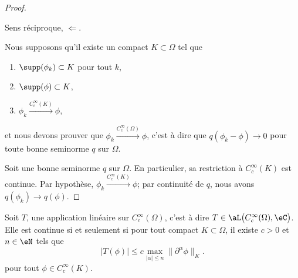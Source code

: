 \begin{proof}
	\begin{proofpart}
		Sens réciproque, \( \Leftarrow\).
	\end{proofpart}
	Nous supposons qu'il existe un compact \( K\subset \Omega\) tel que
	\begin{enumerate}
		\item \( \supp(\phi_k)\subset K\) pour tout \( k\),
		\item
		      \( \supp(\phi)\subset K\),
		\item
		      \( \phi_k\stackrel{ C^{\infty}_c(K)}{\longrightarrow} \phi\),
	\end{enumerate}
	et nous devons prouver que \( \phi_k\stackrel{ C^{\infty}_c(\Omega)}{\longrightarrow} \phi\), c'est à dire que \( q(\phi_k-\phi)\to 0\) pour toute bonne seminorme \( q\) sur \( \Omega\).

	Soit une bonne seminorme \( q\) sur \( \Omega\). En particulier, sa restriction à \( C^{\infty}_c(K)\) est continue. Par hypothèse, \( \phi_k\stackrel{ C^{\infty}_c(K)}{\longrightarrow} \phi\); par continuité de \( q\), nous avons \( q(\phi_k)\to q(\phi)\).
\end{proof}

\begin{theorem}
	Soit \( T\), une application linéaire sur \( C^{\infty}_c(\Omega)\), c'est à dire \( T\in \aL\big( C^{\infty}_c(\Omega), \eC \big)\). Elle est continue si et seulement si pour tout compact \( K\subset \Omega\), il existe \( c>0\) et \( n\in \eN\) tels que
	\begin{equation}
		| T(\phi) |\leq c\max_{| \alpha |\leq n}\| \partial^{\alpha}\phi \|_{K}.
	\end{equation}
	pour tout \( \phi\in C^{\infty}_c(K)\).
\end{theorem}

